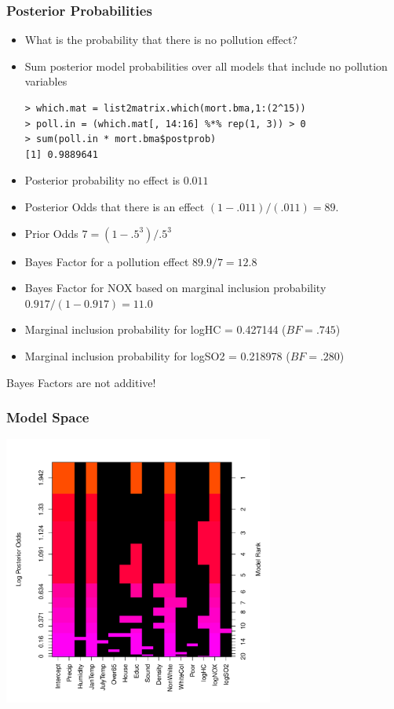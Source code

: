 \documentclass[handout]{beamer}
\begin{document}
\begin{frame}[fragile]
\frametitle{Posterior Probabilities}
  \begin{itemize}
  \item What is the probability that there is no pollution effect? \pause 
\item Sum posterior model probabilities over all models that include
  no pollution variables \pause 
\begin{verbatim}
> which.mat = list2matrix.which(mort.bma,1:(2^15))
> poll.in = (which.mat[, 14:16] %*% rep(1, 3)) > 0
> sum(poll.in * mort.bma$postprob)
[1] 0.9889641
\end{verbatim}\pause 
\item Posterior probability  no effect is $0.011$ \pause 
\item Posterior Odds that there is an effect  $(1 - .011)/(.011) = 89.$ \pause 
\item Prior Odds $7 = (1 - .5^3)/.5^3$ \pause 
\item Bayes Factor for a pollution effect $ 89.9/7 = 12.8$ \pause 
\item Bayes Factor for NOX based on marginal inclusion probability
  $0.917/(1 - 0.917) = 11.0$ \pause  
\item Marginal inclusion probability for logHC =  0.427144 ($BF=.745$)
\item Marginal inclusion probability for logSO2 = 0.218978 ($BF=.280$)
\end{itemize}
Bayes Factors are not additive! 
\end{frame}
\begin{frame}\frametitle{Model Space}
  \includegraphics[height=3.5in]{mort-image}
\end{frame}
\end{document}
